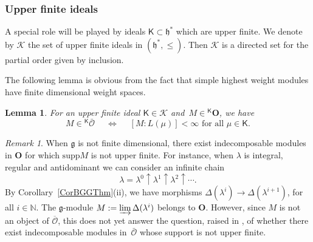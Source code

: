 \documentclass[11pt]{amsart}
\newcommand{\cK}{\mathcal{K}}
\newcommand{\KKK}{\mathsf{K}}
\newcommand{\supp}{\mathrm{supp}}
\newcommand{\rR}{\Phi}
\newcommand{\cO}{\mathcal O}
\newcommand{\bO}{\mathbf{O}}
\newcommand{\fg}{\mathfrak{g}}
\newcommand{\fh}{\mathfrak{h}}
\newcommand{\mN}{\mathbb{N}}
\newcommand{\mZ}{\mathbb{Z}}
\numberwithin{equation}{section}
\theoremstyle{plain}
\newtheorem{lemma}[subsubsection]{Lemma}
\theoremstyle{remark}
\newtheorem{rem}[subsubsection]{Remark}
\theoremstyle{remark}
\theoremstyle{construction}
\begin{document}
\subsubsection{Upper finite ideals}A special role will be played by ideals $\KKK\subset \fh^\ast$ which are upper finite. We denote by $\cK$ the set of upper finite ideals in $(\fh^\ast,\le)$. Then $\cK$ is a directed set for the partial order given by inclusion.


The following lemma is obvious from the fact that simple highest weight modules have finite dimensional weight spaces.
\begin{lemma}\label{LemKmult}
For an upper finite ideal $\KKK\in\cK$ and~$M\in{}^{\KKK}\bO$, we have 
$$M\in{}^{\KKK}\bar{\cO}\quad\;\Leftrightarrow\; \quad [M:L(\mu)]<\infty\mbox{ for all $\mu\in\KKK$.}$$
\end{lemma}


\begin{rem}
When $\fg$ is not finite dimensional, there exist indecomposable modules in $\bO$ for which $\supp M $ is not upper finite. For instance, when $\lambda$ is integral, regular and antidominant we can consider an infinite chain
$$\lambda=\lambda^0\uparrow\lambda^1\uparrow \lambda^2\uparrow\cdots.$$
By Corollary~\ref{CorBGGThm}(ii), we have morphisms $\Delta(\lambda^i)\to\Delta(\lambda^{i+1})$, for all $i\in\mN$. The $\fg$-module $M:=\varinjlim \Delta(\lambda^i)$ belongs to $\bO$. However, since $M$ is not {an object of} $\overline{\cO}$, this does not yet answer the question, raised in \cite[Section~5.3]{NamT}, of whether there exist indecomposable modules in~$\bar{\cO}$ whose support is not upper finite.
\end{rem}


\end{document}

